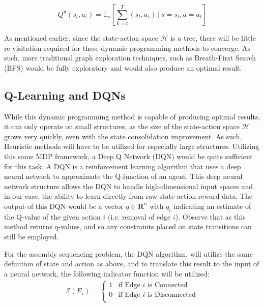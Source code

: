\documentclass{article}
\begin{document}
\begin{equation}\label{eq:quality}
    Q^\pi\left(s_t, a_t\right)=\mathbb{E}_\pi\left[\sum_{k=t}^T \left(s_t, a_t\right)\ \bigg|\ s=s_t, a=a_t\right]
\end{equation}

As mentioned earlier, since the state-action space $\mathcal{H}$ is a tree, there will be little re-visitation required for these dynamic programming methods to converge. As such, more traditional graph exploration techniques, such as Breath-First Search (BFS) would be fully exploratory and would also produce an optimal result.

\subsection{Q-Learning and DQNs}
While this dynamic programming method is capable of producing optimal results, it can only operate on small structures, as the size of the state-action space $\mathcal{H}$ grows very quickly, even with the state consolidation improvement. As such, Heuristic methods will have to be utilized for especially large structures. Utilizing this same MDP framework, a Deep Q Network (DQN) would be quite sufficient for this task. A DQN is a reinforcement learning algorithm that uses a deep neural network to approximate the Q-function of an agent. This deep neural network structure allows the DQN to handle high-dimensional input spaces and in our case, the ability to learn directly from raw state-action-reward data. The output of this DQN would be a vector $q \in \mathbf{R}^n$ with $q_i$ indicating an estimate of the Q-value of the given action $i$ (i.e. removal of edge $i$). Observe that as this method returns q-values, and so any constraints placed on state transitions can still be employed.

For the assembly sequencing problem, the DQN algorithm, will utilize the same definition of state and action as above, and to translate this result to the input of a neural network, the following indicator function will be utilized:
\begin{align*}
    \mathcal{I}(E_i) =
    \begin{cases}
        1 & \text{if Edge } i \text{ is Connected}\\
        0 & \text{if Edge } i \text{ is Disconnected}\\
    \end{cases}
\end{align*}
\end{document}
